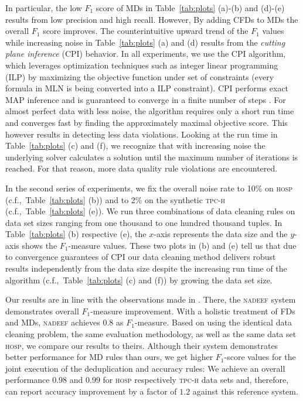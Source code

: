 In particular, the low $F_1$ score of MDs in Table~\ref{tab:plots} (a)-(b) and (d)-(e) results from low precision and high recall. However, By adding CFDs to MDs the overall $F_1$ score improves. The counterintuitive upward trend of the $F_1$ values while increasing noise in Table~\ref{tab:plots} (a) and (d) results from the \textit{cutting plane inference} (CPI) \cite{riedel08improving} behavior. In all experiments, we use the CPI algorithm, which leverages optimization techniques such as integer linear programming (ILP) \cite{riedel08improving, NoessnerNS13} by maximizing the objective function under set of constraints (every formula in MLN is being converted into a ILP constraint). CPI performs exact MAP inference and is guaranteed to converge in a finite number of steps \cite{riedel08improving}. For almost perfect data with less noise, the algorithm requires only a short run time and converges fast by finding the approximately maximal objective score. This however results in detecting less data violations. Looking at the run time in Table~\ref{tab:plots} (c) and (f), we recognize that with increasing noise the underlying solver calculates a solution until the maximum number of iterations is reached. For that reason, more data quality rule violations are encountered. 

In the second series of experiments, we fix the overall noise rate to 10\% on \textsc{hosp} (c.f.,~Table~\ref{tab:plots} (b)) and to 2\% on the synthetic \textsc{tpc-h} (c.f.,~Table~\ref{tab:plots} (e)). We run three combinations of data cleaning rules on data set sizes ranging from one thousand to one hundred thousand tuples. In Table~\ref{tab:plots} (b) respective (e), the $x$-axis represents the data size and the $y$-axis shows the $F_1$-measure values. These two plots in (b) and (e) tell us that due to convergence guarantees of CPI our data cleaning method delivers robust results independently from the data size despite the increasing run time of the algorithm (c.f.,~Table~\ref{tab:plots} (c) and (f)) by growing the data set size. %

Our results are in line with the observations made in \cite{Dallachiesa:2013:NCD:2463676.2465327}. There, the \textsc{nadeef} system demonstrates overall $F_1$-measure improvement. With a holistic treatment of FDs and MDs, \textsc{nadeef} achieves $0.8$ as $F_1$-measure. Based on using the identical data cleaning problem, the same evaluation methodology, as well as the same data set \textsc{hosp}, we compare our results to theirs. Although their system demonstrates better performance for MD rules than ours, we get higher $F_1$-score values for the joint execution of the deduplication and accuracy rules: We achieve an overall performance $0.98$ and $0.99$ for \textsc{hosp} respectively \textsc{tpc-h} data sets and, therefore, can report accuracy improvement by a factor of $1.2$ against this reference system.

